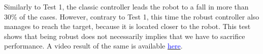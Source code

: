 Similarly to Test 1, the classic controller leads the robot to a fall in more than 30\% of the cases.
However, contrary to Test 1, this time the robust controller also manages to reach the target, because it is located closer to the robot.
This test shows that being robust does not necessarily implies that we have to sacrifice performance. A video result of the same is available \href{https://youtu.be/IA-HhoR0g-4}{\textcolor{blue}{here}}.

